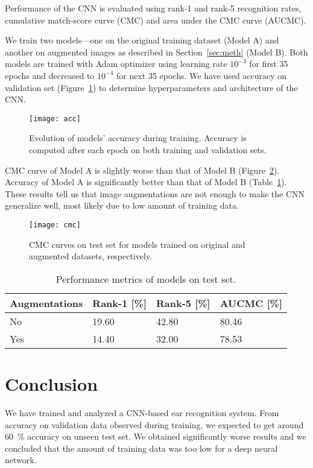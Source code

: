 \documentclass[9pt]{IEEEtran}
\begin{document}
Performance of the CNN is evaluated using rank-1 and rank-5 recognition rates, cumulative match-score curve (CMC) and area under the CMC curve (AUCMC).

We train two models---one on the original training dataset (Model A) and another on augmented images as described in Section~\ref{sec:meth} (Model B).
Both models are trained with Adam optimizer using learning rate $10^{-3}$ for first 35 epochs and decreased to $10^{-4}$ for next 35 epochs.
We have used accuracy on validation set (Figure~\ref{fig:acc}) to determine hyperparameters and architecture of the CNN.

\begin{figure}[ht]
    \centering
    \texttt{[image: acc]}
    \caption{Evolution of models' accuracy during training.
    Accuracy is computed after each epoch on both training and validation sets.}
    \label{fig:acc}
\end{figure}

CMC curve of Model A is slightly worse than that of Model B (Figure~\ref{fig:cmc}).
Accuracy of Model A is significantly better than that of Model B (Table~\ref{tab:metrics}).
These results tell us that image augmentations are not enough to make the CNN generalize well, most likely due to low amount of training data.

\begin{figure}[ht]
    \centering
    \texttt{[image: cmc]}
    \caption{CMC curves on test set for models trained on original and augmented datasets, respectively.}
    \label{fig:cmc}
\end{figure}

\begin{table}[ht]
    \caption{Performance metrics of models on test set.}
    \label{tab:metrics}
    \centering
    \begin{tabular}{llll}
        Augmentations & Rank-1 [\%] & Rank-5 [\%] & AUCMC [\%] \\
        \hline
        No & 19.60 & 42.80 & 80.46 \\
        Yes & 14.40 & 32.00 & 78.53
    \end{tabular}
\end{table}

\section{Conclusion}

We have trained and analyzed a CNN-based ear recognition system.
From accuracy on validation data observed during training, we expected to get around 60~\% accuracy on unseen test set.
We obtained significantly worse results and we concluded that the amount of training data was too low for a deep neural network.
\end{document}

